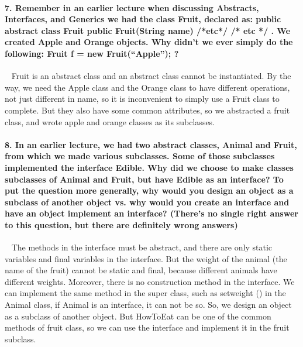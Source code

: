 \documentclass[12pt, leqno]{article}
\begin{document}
\paragraph*{7. Remember in an earlier lecture when discussing Abstracts, Interfaces, and Generics we had the class Fruit, declared as: public abstract class Fruit { public Fruit(String name) { /*etc*/ } /* etc */ }. We created Apple and Orange objects. Why didn’t we ever simply do the following: Fruit f = new Fruit(“Apple”); ?
}~{}
\newline\indent Fruit is an abstract class and an abstract class cannot be instantiated. By the way, we need the Apple class and the Orange class to have different operations, not just different in name, so it is inconvenient to simply use a Fruit class to complete. But they also have some common attributes, so we abstracted a fruit class, and wrote apple and orange classes as its subclasses.
\newpage
\paragraph*{8. In an earlier lecture, we had two abstract classes, Animal and Fruit, from which we made various subclasses. Some of those subclasses implemented the interface Edible. Why did we choose to make classes subclasses of Animal and Fruit, but have Edible as an interface? To put the question more generally, why would you design an object as a subclass of another object vs. why would you create an interface and have an object implement an interface? (There’s no single right answer to this question, but there are definitely wrong answers)
}~{}
\newline\indent The methods in the interface must be abstract, and there are only static variables and final variables in the interface. But the weight of the animal (the name of the fruit) cannot be static and final, because different animals have different weights. Moreover, there is no construction method in the interface. We can implement the same method in the super class, such as setweight () in the Animal class, if Animal is an interface, it can not be so. So, we design an object as a subclass of another object.
\newline\indent But HowToEat can be one of the common methods of fruit class, so we can use the interface and implement it in the fruit subclass.
\end{document}
